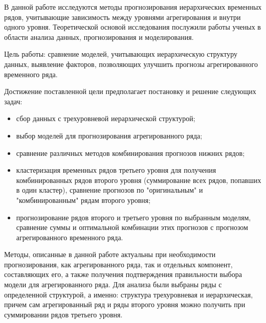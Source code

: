 \documentclass[12pt,a4paper, oneside]{extreport}
\begin{document}
В данной работе исследуются методы прогнозирования иерархических временных рядов, учитывающие зависимость между уровнями агрегирования и внутри одного уровня. Теоретической основой исследования послужили работы ученых в области анализа данных, прогнозирования и моделирования.



Цель работы: сравнение моделей, учитывающих иерархическую структуру данных, выявление факторов, позволяющих улучшить прогнозы агрегированного временного ряда.



Достижение поставленной цели предполагает постановку и решение следующих задач:

\begin{itemize}
	\item сбор данных с трехуровневой иерархической структурой;
	\item выбор моделей для прогнозирования агрегированного ряда;
	\item сравнение различных методов комбинирования прогнозов нижних рядов; 
	\item кластеризация временных рядов третьего уровня для получения комбинированных рядов второго уровня (суммирование всех рядов, попавших в один кластер), сравнение прогнозов по  "оригинальным" и "комбинированным" рядам второго уровня;
	\item прогнозирование рядов второго и третьего уровня по выбранным моделям, сравнение суммы и оптимальной комбинации этих прогнозов с прогнозом агрегированного временного ряда.

\end{itemize}


Методы, описанные в данной работе актуальны при необходимости прогнозирования, как агрегированного ряда, так и отдельных компонент, составляющих его, а также получения подтверждения правильности выбора модели для агрегированного ряда.
Для анализа были выбраны ряды с определенной структурой, а именно: 
структура трехуровневая и иерархическая, причем сам агрегированный ряд и ряды второго уровня можно получить при суммировании рядов третьего уровня. 
\end{document}
